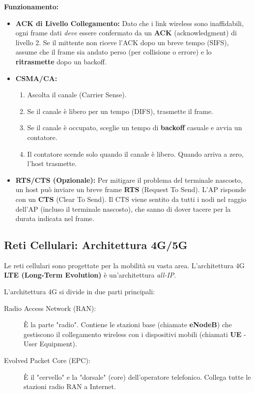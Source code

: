 \textbf{Funzionamento:}
\begin{itemize}
    \item \textbf{ACK di Livello Collegamento:} Dato che i link wireless sono inaffidabili, ogni frame dati \textit{deve} essere confermato da un \textbf{ACK} (acknowledgment) di livello 2. Se il mittente non riceve l'ACK dopo un breve tempo (SIFS), assume che il frame sia andato perso (per collisione o errore) e lo \textbf{ritrasmette} dopo un backoff.
    \item \textbf{CSMA/CA:}
        \begin{enumerate}
            \item Ascolta il canale (Carrier Sense).
            \item Se il canale è libero per un tempo (DIFS), trasmette il frame.
            \item Se il canale è occupato, sceglie un tempo di \textbf{backoff} casuale e avvia un contatore.
            \item Il contatore scende solo quando il canale è libero. Quando arriva a zero, l'host trasmette.
        \end{enumerate}
    \item \textbf{RTS/CTS (Opzionale):} Per mitigare il problema del terminale nascosto, un host può inviare un breve frame \textbf{RTS} (Request To Send). L'AP risponde con un \textbf{CTS} (Clear To Send). Il CTS viene sentito da tutti i nodi nel raggio dell'AP (incluso il terminale nascosto), che sanno di dover tacere per la durata indicata nel frame.
\end{itemize}

\subsection{Reti Cellulari: Architettura 4G/5G}
Le reti cellulari sono progettate per la mobilità su vasta area. L'architettura 4G \textbf{LTE (Long-Term Evolution)} è un'architettura \textit{all-IP}.

L'architettura 4G si divide in due parti principali:
\begin{description}
    \item[Radio Access Network (RAN):] È la parte "radio". Contiene le stazioni base (chiamate \textbf{eNodeB}) che gestiscono il collegamento wireless con i dispositivi mobili (chiamati \textbf{UE} - User Equipment).
    \item[Evolved Packet Core (EPC):] È il "cervello" e la "dorsale" (core) dell'operatore telefonico. Collega tutte le stazioni radio RAN a Internet.
\end{description}

